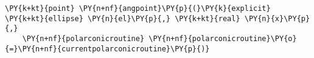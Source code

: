\begin{Verbatim}[commandchars=\\\{\}]
    \PY{k+kt}{point} \PY{n+nf}{angpoint}\PY{p}{(}\PY{k}{explicit} \PY{k+kt}{ellipse} \PY{n}{el}\PY{p}{,} \PY{k+kt}{real} \PY{n}{x}\PY{p}{,}
    \PY{n+nf}{polarconicroutine} \PY{n+nf}{polarconicroutine}\PY{o}{=}\PY{n+nf}{currentpolarconicroutine}\PY{p}{)}
\end{Verbatim}
